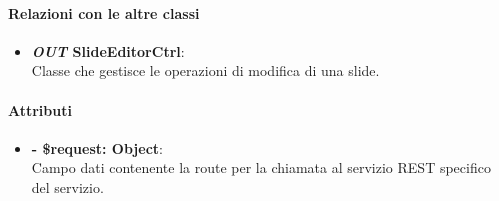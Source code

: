 	\paragraph{Relazioni con le altre classi}
	\begin{itemize}
		\item \textbf{\textit{OUT} SlideEditorCtrl}:\\
			Classe che gestisce le operazioni di modifica di una slide.
	\end{itemize}
	
	\paragraph{Attributi}
	\begin{itemize}
		\item \textbf{- \$request: Object}:\\
		Campo dati contenente la route per la chiamata al servizio REST specifico del servizio.
	\end{itemize}	
	
